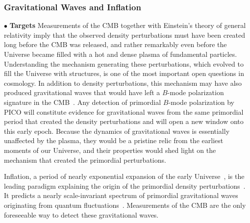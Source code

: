 \documentclass[PICOReport.tex]{subfiles}
\begin{document}
\subsubsection{Gravitational Waves and Inflation}
\label{sec:inflation}

\noindent$\bullet$ {\bf Targets} \hspace{0.1in} 
Measurements of the \ac{CMB} together with Einstein's theory of general relativity imply that the observed density perturbations must have been created long before the \ac{CMB} was released, and rather remarkably even before the Universe became filled with a hot and dense plasma of fundamental particles. Understanding the mechanism generating these perturbations, which evolved to fill the Universe with structures, is one of the most important open questions in cosmology. In addition to density perturbations, this mechanism may have also produced gravitational waves that would have left a $B$-mode polarization signature in the CMB~\cite{seljak97,kamionkowski97a}.  Any detection of primordial $B$-mode polarization by PICO will constitute evidence for gravitational waves from the same primordial period that created the density perturbations and will open a new window onto this early epoch. Because the dynamics of gravitational waves is essentially unaffected by the plasma, they would be a pristine relic from the earliest moments of our Universe, and their properties would shed light on the mechanism that created the primordial perturbations. 

Inflation, a period of nearly exponential expansion of the early Universe~\cite{Guth:1980zm,Linde:1981mu,Albrecht:1982wi,Starobinsky:1980te}, is the leading paradigm explaining the origin of the primordial density perturbations~\cite{Mukhanov:1981xt,Guth:1982ec,Hawking:1982cz,Starobinsky:1982ee,Bardeen:1983qw}. It predicts a nearly scale-invariant spectrum of primordial gravitational waves originating from quantum fluctuations~\cite{Starobinsky:1979ty}. Measurements of the \ac{CMB} are the only foreseeable way to detect these gravitational waves.
\end{document}
